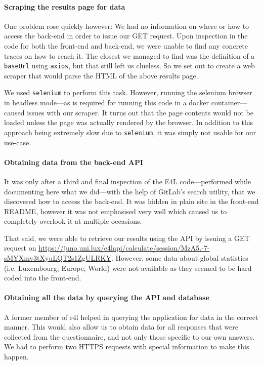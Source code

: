 \paragraph{Scraping the results page for data}

One problem rose quickly however: We had no information on where or
how to access the back-end in order to issue our GET request. Upon
inspection in the code for both the front-end and back-end, we were
unable to find any concrete traces on how to reach it. The closest we
managed to find was the definition of a \verb|baseUrl| using \verb|axios|,
but that still left us clueless. So we set out to create a web scraper
that would parse the HTML of the above results page.

We used \verb|selenium| to perform this task. However, running the
selenium browser in headless mode---as is required for running this
code in a docker container---caused issues with our scraper. It turns
out that the page contents would not be loaded unless the page was
actually rendered by the browser. In addition to this approach being
extremely slow due to \verb|selenium|, it was simply not usable for
our use-case.

\paragraph{Obtaining data from the back-end API}

It was only after a third and final inspection of the E4L
code---performed while documenting here what we did---with the help of
GitLab's search utility, that we discovered how to access the
back-end.  It was hidden in plain site in the front-end README,
however it was not emphasised very well which caused us to completely
overlook it at multiple occasions.

That said, we were able to retrieve our results using the API by
issuing a GET request on
\url{https://juno.uni.lux/e4lapi/calculate/session/MzA5.-7-sMYXmv3tXyuLQT2s1ZgULRKY}.
However, some data about global statistics (i.e. Luxembourg, Europe,
World) were not available as they seemed to be hard coded into the
front-end.

\paragraph{Obtaining all the data by querying the API and database}

A former member of \gls{e4l} helped in querying the application for
data in the correct manner. This would also allow us to obtain data
for all responses that were collected from the questionnaire, and not
only those specific to our own answers. We had to perform two HTTPS
requests with special information to make this happen.

